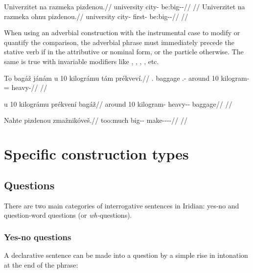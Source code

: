 \pex
\a
\begingl
\gla Univerzitet na razmeka pizdenou.//
\glb university \Loc{} city-\Acc{} be:big-\Comp{}-\Nz{}//
\glft {}//
\endgl
\a
\begingl
\gla Univerzitet na razmeka ohnu pizdenou.//
\glb university \Loc{} city-\Acc{} first-\Ins{} be:big-\Comp{}-\Nz{}//
\glft {}//
\endgl
\xe

When using an adverbial construction with the instrumental case to modify or
quantify the comparison, the adverbial phrase must immediately precede the
stative verb if in the attributive or nominal form, or the particle 
otherwise. The same is true with invariable modifiers like ,
, , , etc.

\ex
\begingl
\gla To bagáž jánám u 10 kilográmu tám prékveví.//
\glb \Dem{}.\Prox{} baggage \Dem{}.\Med{}-\Agt{} around 10 kilogram-\Ins{} \Comp{}= heavy-\Cont{}//
\glft {}//
\endgl
\xe

\ex
\begingl
\gla u 10 kilográmu prékvení bagáž//
\glb around 10 kilogram-\Ins{} heavy-\Comp{}-\Att{} baggage//
\glft {}//
\endgl
\xe

\ex
\begingl
\gla Nahte pizdenou zmažnikóveš.//
\glb too:much big-\Comp{}-\Nz{} make-\Pv{}-\Pf{}-\Nz{}-\Second{}\Sg{}//
\glft {}//
\endgl
\xe

\section{Specific construction types}
\subsection{Questions}

There are two  main  categories  of  interrogative  sentences in Iridian: yes-no
and  question-word questions (or \emph{wh-}questions).

\subsubsection{Yes-no questions}

A declarative sentence can be made into a question by a simple rise in
intonation at the end of the phrase:

